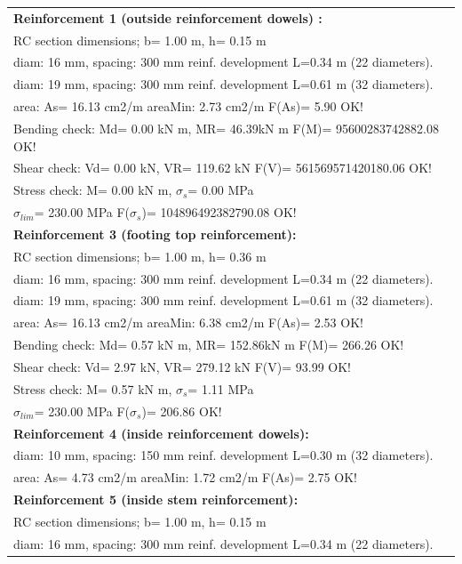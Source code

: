 \begin{center}
\begin{supertabular}[H]{|l|}
\hline
\textbf{Reinforcement 1 (outside reinforcement dowels) :} \\
  RC section dimensions; b= 1.00 m, h= 0.15 m\\
  diam: 16 mm, spacing: 300 mm  reinf. development L=0.34 m (22 diameters).\\
  diam: 19 mm, spacing: 300 mm  reinf. development L=0.61 m (32 diameters).\\
  area: As=  16.13 cm2/m areaMin:   2.73 cm2/m  F(As)= 5.90 OK!\\
  Bending check: Md=   0.00 kN m, MR=  46.39kN m  F(M)= 95600283742882.08 OK!\\
  Shear check: Vd=   0.00 kN,  VR= 119.62 kN  F(V)= 561569571420180.06 OK!\\
  Stress check: M=   0.00 kN m, $\sigma_s$=   0.00 MPa\\
    $\sigma_{lim}$= 230.00 MPa  F($\sigma_s$)= 104896492382790.08 OK!\\
\textbf{Reinforcement 3 (footing top reinforcement):}\\
  RC section dimensions; b= 1.00 m, h= 0.36 m\\
  diam: 16 mm, spacing: 300 mm  reinf. development L=0.34 m (22 diameters).\\
  diam: 19 mm, spacing: 300 mm  reinf. development L=0.61 m (32 diameters).\\
  area: As=  16.13 cm2/m areaMin:   6.38 cm2/m  F(As)= 2.53 OK!\\
  Bending check: Md=   0.57 kN m, MR= 152.86kN m  F(M)= 266.26 OK!\\
  Shear check: Vd=   2.97 kN,  VR= 279.12 kN  F(V)= 93.99 OK!\\
  Stress check: M=   0.57 kN m, $\sigma_s$=   1.11 MPa\\
    $\sigma_{lim}$= 230.00 MPa  F($\sigma_s$)= 206.86 OK!\\
\textbf{Reinforcement 4 (inside reinforcement dowels):}\\
  diam: 10 mm, spacing: 150 mm  reinf. development L=0.30 m (32 diameters).\\
  area: As=   4.73 cm2/m areaMin:   1.72 cm2/m  F(As)= 2.75 OK!\\
\textbf{Reinforcement 5 (inside stem reinforcement):}\\
  RC section dimensions; b= 1.00 m, h= 0.15 m\\
  diam: 16 mm, spacing: 300 mm  reinf. development L=0.34 m (22 diameters).\\

\end{supertabular}
\end{center}
